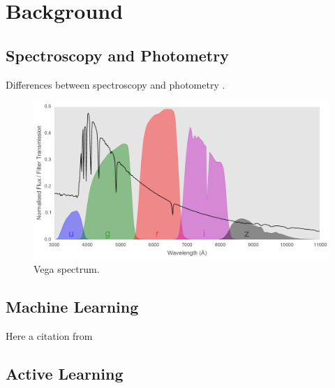 
\chapter{Background}
\label{cha:firstexp}

\section{Spectroscopy and Photometry}
\label{sec:why1}

Differences between spectroscopy and photometry
.

\begin{figure}[h]
	\centering
	\includegraphics[width=\textwidth]{figures/vega_filters_and_spectrum}
	\caption{Vega spectrum.}
	\label{fig:vega}
\end{figure}



\section{Machine Learning}
\label{sec:what1}

Here a citation from \cite{wolf14}


\section{Active Learning}
\label{sec:active_background}


